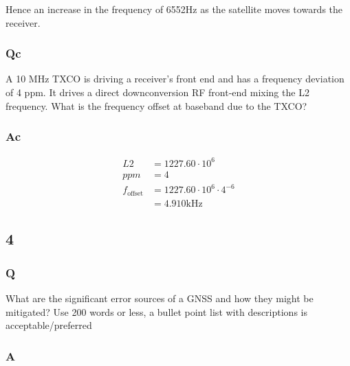 \documentclass[11pt]{article}
\begin{document}
Hence an increase in the frequency of 6552Hz as the satellite moves towards the receiver.

\subsubsection{Qc}
A 10 MHz TXCO is driving a receiver’s front end and has a frequency deviation of 4 ppm.  It drives a direct downconversion RF front-end mixing the L2 frequency.  What is the frequency offset at baseband due to the TXCO?
\subsubsection{Ac}

\begin{equation}
    \begin{split}
        L2 &= 1227.60 \cdot 10^6\\
        ppm &= 4\\
        f_{\text{offset}} &= 1227.60 \cdot 10^6 \cdot 4^{-6} \\
        &= 4.910 \text{kHz}
    \end{split}
\end{equation}

\subsection{4}

\subsubsection{Q}
What are the significant error sources of a GNSS and how they might be mitigated?  Use 200 words or less, a bullet point list with descriptions is acceptable/preferred
\subsubsection{A}
\end{document}
